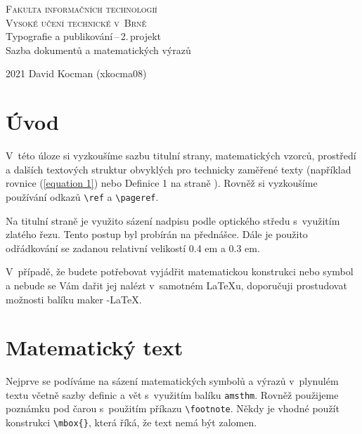 \documentclass[11pt, twocolumn]{article}
\begin{document}
\begin{titlepage}
\begin{center}
    {\Huge \textsc{Fakulta informačních technologií\vspace{0.4em} \\ Vysoké učení technické v~Brně}}\\
    {\huge Typografie a publikování\,--\,2.\,projekt\vspace{0.3em}\\
    Sazba dokumentů a matematických výrazů}
\end{center}
    {\LARGE 2021 \hfill David Kocman (xkocma08)}

\end{titlepage}

\section*{Úvod}
V~této úloze si vyzkoušíme sazbu titulní strany, matematic\-kých vzorců, prostředí a dalších textových struktur obvyk\-lých pro technicky zaměřené texty (například rovnice (\ref{equation 1})
nebo Definice 1 na straně \pageref{Definice 1}). Rovněž si vyzkoušíme pou\-žívání odkazů \verb|\ref| a \verb|\pageref|.

Na titulní straně je využito sázení nadpisu podle op\-tického středu s~využitím zlatého řezu. Tento postup byl
probírán na přednášce. Dále je použito odřádkování se
zadanou relativní velikostí 0.4 em a 0.3 em.

V~případě, že budete potřebovat vyjádřit matematickou
konstrukci nebo symbol a nebude se Vám dařit jej nalézt
v~samotném \LaTeX u, doporučuji prostudovat možnosti ba\-líku maker \AmS-\LaTeX.

\section{Matematický text}

Nejprve se podíváme na sázení matematických symbolů
a výrazů v~plynulém textu včetně sazby definic a vět s~vy\-užitím balíku \verb|amsthm|. Rovněž použijeme poznámku pod
čarou s~použitím příkazu \verb|\footnote|. Někdy je vhodné
použít konstrukci \verb|\mbox{}|, která říká, že text nemá být
zalomen.
\end{document}
